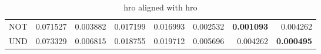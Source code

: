 \begin{table}[H]
\begin{center}
{\begin{tabular}{lrrrrrrr}
NOT & {\cellcolor[HTML]{004E2D}} \color[HTML]{F1F1F1} 0.071527 & {\cellcolor[HTML]{FCFED3}} \color[HTML]{000000} 0.003882 & {\cellcolor[HTML]{DDF2A6}} \color[HTML]{000000} 0.017199 & {\cellcolor[HTML]{DEF2A7}} \color[HTML]{000000} 0.016993 & {\cellcolor[HTML]{FDFEDA}} \color[HTML]{000000} 0.002532 & {\cellcolor[HTML]{FEFFE1}} \color[HTML]{000000} \bfseries 0.001093 & {\cellcolor[HTML]{FBFED2}} \color[HTML]{000000} 0.004262 \\
UND & {\cellcolor[HTML]{004629}} \color[HTML]{F1F1F1} 0.073329 & {\cellcolor[HTML]{F9FDC5}} \color[HTML]{000000} 0.006815 & {\cellcolor[HTML]{D7EFA2}} \color[HTML]{000000} 0.018755 & {\cellcolor[HTML]{D3EDA0}} \color[HTML]{000000} 0.019712 & {\cellcolor[HTML]{FAFDCB}} \color[HTML]{000000} 0.005696 & {\cellcolor[HTML]{FBFED2}} \color[HTML]{000000} 0.004262 & {\cellcolor[HTML]{FFFFE4}} \color[HTML]{000000} \bfseries 0.000495 \\
\bottomrule
\end{tabular}
}\end{center}
\caption{hro aligned with hro}\end{table}